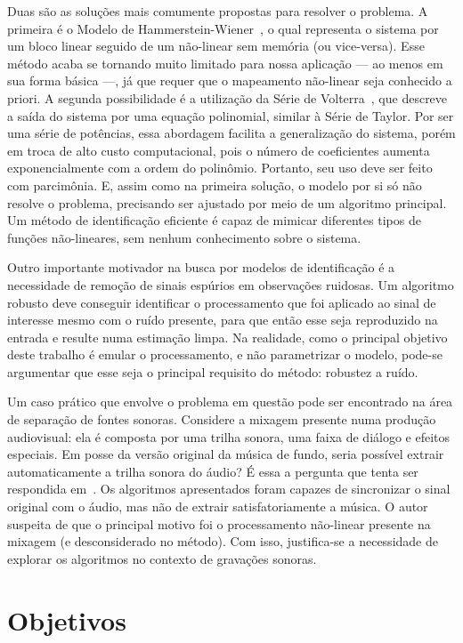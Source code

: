 Duas são as soluções mais comumente propostas para resolver o problema. A primeira é o
Modelo de Hammerstein-Wiener~\cite{ogunfunmi-2007}, o qual representa o sistema por um
bloco linear seguido de um não-linear sem memória (ou vice-versa). Esse método acaba se
tornando muito limitado para nossa aplicação --- ao menos em sua forma básica ---, já
que requer que o mapeamento não-linear seja conhecido a priori. A segunda possibilidade
é a utilização da Série de Volterra~\cite{ogunfunmi-2007}, que descreve a saída do
sistema por uma equação polinomial, similar à Série de Taylor. Por ser uma série de
potências, essa abordagem facilita a generalização do sistema, porém em troca de alto
custo computacional, pois o número de coeficientes aumenta exponencialmente com a ordem
do polinômio. Portanto, seu uso deve ser feito com parcimônia. E, assim como na
primeira solução, o modelo por si só não resolve o problema, precisando ser ajustado
por meio de um algoritmo principal. Um método de identificação eficiente é capaz de
mimicar diferentes tipos de funções não-lineares, sem nenhum conhecimento sobre o
sistema.

Outro importante motivador na busca por modelos de identificação é a necessidade de
remoção de sinais espúrios em observações ruidosas. Um algoritmo robusto deve conseguir
identificar o processamento que foi aplicado ao sinal de interesse mesmo com o ruído
presente, para que então esse seja reproduzido na entrada e resulte numa estimação
limpa. Na realidade, como o principal objetivo deste trabalho é emular o processamento,
e não parametrizar o modelo, pode-se argumentar que esse seja o principal requisito do
método: robustez a ruído.

Um caso prático que envolve o problema em questão pode ser encontrado na área de
separação de fontes sonoras. Considere a mixagem presente numa produção audiovisual:
ela é composta por uma trilha sonora, uma faixa de diálogo e efeitos especiais. Em
posse da versão original da música de fundo, seria possível extrair automaticamente a
trilha sonora do áudio? É essa a pergunta que tenta ser respondida
em~\cite{lordelo-2018}. Os algoritmos apresentados foram capazes de sincronizar o sinal
original com o áudio, mas não de extrair satisfatoriamente a música. O autor suspeita
de que o principal motivo foi o processamento não-linear presente na mixagem (e
desconsiderado no método). Com isso, justifica-se a necessidade de explorar os
algoritmos no contexto de gravações sonoras.

\section{Objetivos}

